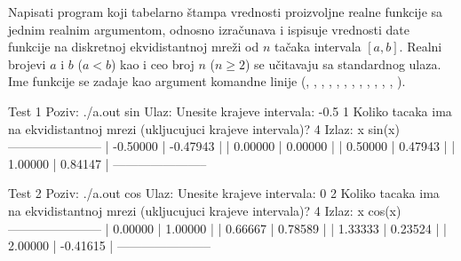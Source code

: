 \begin{Exercise}[label=345]
Napisati program koji tabelarno štampa vrednosti proizvoljne realne funkcije sa jednim realnim
argumentom, odnosno izračunava i ispisuje
vrednosti date funkcije na diskretnoj ekvidistantnoj mreži od
$n$ tačaka intervala $[a, b]$. Realni brojevi
$a$ i $b$ ($a<b$) kao i ceo broj $n$
($n \geq 2$) se učitavaju sa standardnog ulaza. Ime funkcije
se zadaje kao argument komandne linije (, , , ,
, , , , , , , , ).

\begin{maxitest}
\begin{test}{Test 1}
Poziv: ./a.out sin
Ulaz: Unesite krajeve intervala:
      -0.5 1
      Koliko tacaka ima na ekvidistantnoj mrezi (ukljucujuci krajeve intervala)?
      4
Izlaz:      x        sin(x)
      -----------------------
      | -0.50000 | -0.47943 |
      |  0.00000 |  0.00000 |
      |  0.50000 |  0.47943 |
      |  1.00000 |  0.84147 |
      -----------------------
\end{test}
\end{maxitest}

\begin{maxitest}
\begin{test}{Test 2}
Poziv: ./a.out cos
Ulaz: Unesite krajeve intervala:
      0 2
      Koliko tacaka ima na ekvidistantnoj mrezi (ukljucujuci krajeve intervala)?
      4
Izlaz:      x        cos(x)
       -----------------------
       |  0.00000 |  1.00000 |
       |  0.66667 |  0.78589 |
       |  1.33333 |  0.23524 |
       |  2.00000 | -0.41615 |
       -----------------------
\end{test}
\end{maxitest}
\end{Exercise}
\begin{Answer}[ref=345]
\end{Answer}


